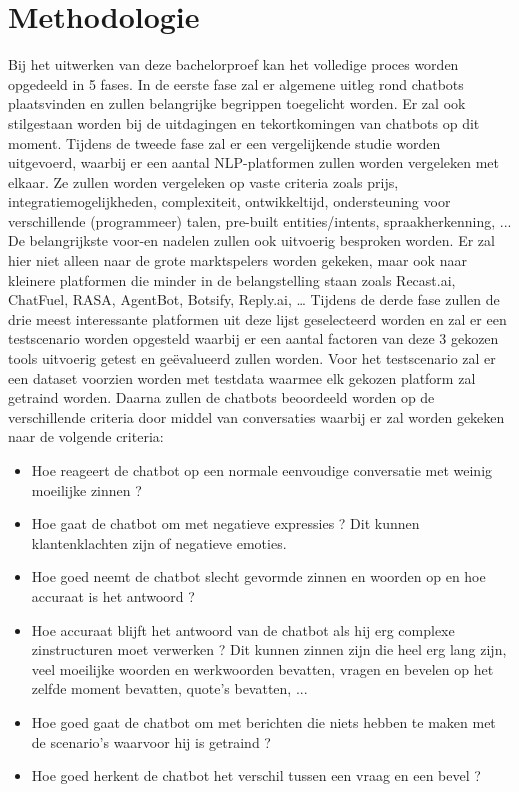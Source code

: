 \section{Methodologie}
\label{sec:methodologie}

Bij het uitwerken van deze bachelorproef kan het volledige proces worden opgedeeld in 5 fases.
In de eerste fase zal er algemene uitleg rond chatbots plaatsvinden en zullen belangrijke begrippen toegelicht worden. Er zal ook stilgestaan worden bij de uitdagingen en tekortkomingen van chatbots op dit moment. Tijdens de tweede fase zal er een vergelijkende studie worden uitgevoerd, waarbij er een aantal NLP-platformen zullen worden vergeleken met elkaar. Ze zullen worden vergeleken op vaste criteria zoals prijs, integratiemogelijkheden, complexiteit, ontwikkeltijd, ondersteuning voor verschillende (programmeer) talen, pre-built entities/intents, spraakherkenning, ... De belangrijkste voor-en nadelen zullen ook uitvoerig besproken worden. Er zal hier niet alleen naar de grote marktspelers worden gekeken, maar ook naar kleinere platformen die minder in de belangstelling staan zoals Recast.ai, ChatFuel, RASA, AgentBot, Botsify, Reply.ai, … Tijdens de derde fase zullen de drie meest interessante platformen uit deze lijst geselecteerd worden en zal er een testscenario worden opgesteld waarbij er een aantal factoren van deze 3 gekozen tools uitvoerig getest en geëvalueerd zullen worden. Voor het testscenario zal er een dataset voorzien worden met testdata waarmee elk gekozen platform zal getraind worden. Daarna zullen de chatbots beoordeeld worden op de verschillende criteria door middel van conversaties waarbij er zal worden gekeken naar de volgende criteria:\bigskip

\begin{itemize}
    \item Hoe reageert de chatbot op een normale eenvoudige conversatie met weinig moeilijke zinnen ?
    \item Hoe gaat de chatbot om met negatieve expressies ? Dit kunnen klantenklachten zijn of negatieve emoties.
    \item Hoe goed neemt de chatbot slecht gevormde zinnen en woorden op en hoe accuraat is het antwoord ?
    \item Hoe accuraat blijft het antwoord van de chatbot als hij erg complexe zinstructuren moet verwerken ? Dit kunnen zinnen zijn die heel erg lang zijn, veel moeilijke woorden en werkwoorden bevatten, vragen en bevelen op het zelfde moment bevatten, quote's bevatten, ...
    \item Hoe goed gaat de chatbot om met berichten die niets hebben te maken met de scenario’s waarvoor hij is getraind ?
    \item Hoe goed herkent de chatbot het verschil tussen een vraag en een bevel ?
\end{itemize}


